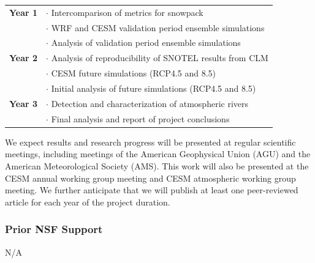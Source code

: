 \documentclass[11pt]{article}
\begin{document}
\begin{tabularx}{\textwidth}{cX}
\hline
\textbf{Year 1} & $\cdot$ Intercomparison of metrics for snowpack \\
& $\cdot$ WRF and CESM validation period ensemble simulations \\
& $\cdot$ Analysis of validation period ensemble simulations \\
\hline
\textbf{Year 2} & $\cdot$ Analysis of reproducibility of SNOTEL results from CLM \\
& $\cdot$ CESM future simulations (RCP4.5 and 8.5) \\
& $\cdot$ Initial analysis of future simulations (RCP4.5 and 8.5) \\
\hline
\textbf{Year 3} & $\cdot$ Detection and characterization of atmospheric rivers \\
& $\cdot$ Final analysis and report of project conclusions \\
\hline
\end{tabularx}

We expect results and research progress will be presented at regular scientific meetings, including meetings of the American Geophysical Union (AGU) and the American Meteorological Society (AMS). This work will also be presented at the CESM annual working group meeting and CESM atmospheric working group meeting. We further anticipate that we will publish at least one peer-reviewed article for each year of the project duration.

\subsubsection{Prior NSF Support}

N/A

  
{\vbox{}}
\end{document}
